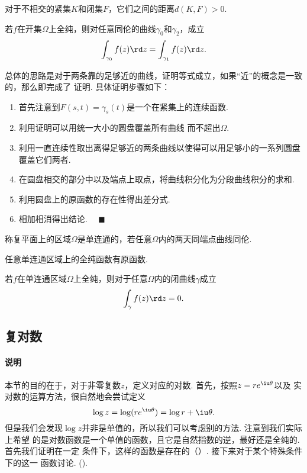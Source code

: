   \begin{lemma}
    \label{lemma: 紧集、闭集、距离}
    对于不相交的紧集$K$和闭集$F$，它们之间的距离$d(K, F)>0$.
  \end{lemma}

  \begin{thm}
    若$f$在开集$\Omega$上全纯，则对任意同伦的曲线$\gamma_0$和$\gamma_2$，成立
    \[
      \int_{\gamma_0}f(z)\rd z = \int_{\gamma_1}f(z)\rd z.
    \]
  \end{thm}
  \proof
    总体的思路是对于两条靠的足够近的曲线，证明等式成立，如果“近”的概念是一致的，那么即完成了
    证明. 具体证明步骤如下：
    \begin{enumerate}
      \item 首先注意到$F(s, t)=\gamma_s(t)$是一个在紧集上的连续函数.
      \item 利用证明可以用统一大小的圆盘覆盖所有曲线
        而不超出$\Omega$.
      \item 利用一直连续性取出离得足够近的两条曲线以使得可以用足够小的一系列圆盘覆盖它们两者.
      \item 在圆盘相交的部分中以及端点上取点，将曲线积分化为分段曲线积分的求和.
      \item 利用圆盘上的原函数的存在性得出差分式.
      \item 相加相消得出结论. $\quad\blacksquare$
    \end{enumerate}

  \begin{defi}[单连通]
    称复平面上的区域$\Omega$是单连通的，若任意$\Omega$内的两天同端点曲线同伦.
  \end{defi}

  \begin{thm}
    任意单连通区域上的全纯函数有原函数.
  \end{thm}

  \begin{thm}[Cauchy]
    若$f$在单连通区域$\Omega$上全纯，则对于任意$\Omega$内的闭曲线$\gamma$成立
    \[
      \int_\gamma f(z)\rd z = 0.
    \]
  \end{thm}


\subsection{复对数}
  \paragraph{说明}
    本节的目的在于，对于非零复数$z$，定义对应的对数. 首先，按照$z=re^{\iu\theta}$以及
    实对数的运算方法，很自然地会尝试定义
    \begin{equation}
      \label{equ: 复对数}
      \log z = \log(re^{\iu\theta}) = \log r + \iu\theta.
    \end{equation}
    但是我们会发现$\log z$并非是单值的，所以我们可以考虑别的方法. 注意到我们实际上希望
    的是对数函数是一个单值的函数，且它是自然指数的逆，最好还是全纯的. 首先我们证明在一定
    条件下，这样的函数是存在的（）. 接下来对于某个特殊条件下的这一
    函数讨论. ().

